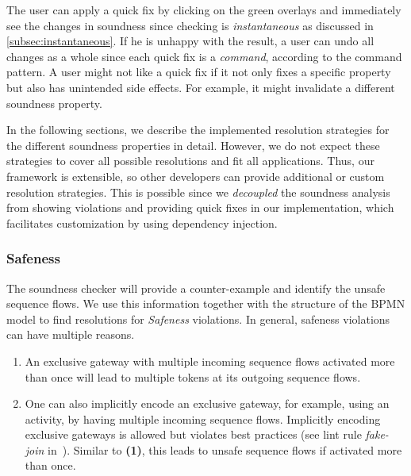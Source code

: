 \documentclass[runningheads]{llncs}
\begin{document}
The user can apply a quick fix by clicking on the green overlays and immediately see the changes in soundness since checking is \textit{instantaneous} as discussed in \autoref{subsec:instantaneous}.
If he is unhappy with the result, a user can undo all changes as a whole since each quick fix is a \textit{command}, according to the command pattern.
A user might not like a quick fix if it not only fixes a specific property but also has unintended side effects.
For example, it might invalidate a different soundness property.

In the following sections, we describe the implemented resolution strategies for the different soundness properties in detail.
However, we do not expect these strategies to cover all possible resolutions and fit all applications.
Thus, our framework is extensible, so other developers can provide additional or custom resolution strategies.
This is possible since we \textit{decoupled} the soundness analysis from showing violations and providing quick fixes in our implementation, which facilitates customization by using dependency injection.

\subsubsection{Safeness} \label{subsec:safeness}
The soundness checker will provide a counter-example and identify the unsafe sequence flows.
We use this information together with the structure of the BPMN model to find resolutions for \textit{Safeness} violations.
In general, safeness violations can have multiple reasons.

\begin{enumerate}
	\item An exclusive gateway with multiple incoming sequence flows activated more than once will lead to multiple tokens at its outgoing sequence flows.
	\item One can also implicitly encode an exclusive gateway, for example, using an activity, by having multiple incoming sequence flows.
	Implicitly encoding exclusive gateways is allowed but violates best practices (see lint rule \textit{fake-join} in~\cite{camundaservicesgmbhBpmnlint2024}).
	Similar to \textbf{(1)}, this leads to unsafe sequence flows if activated more than once.
\end{enumerate}
\end{document}
